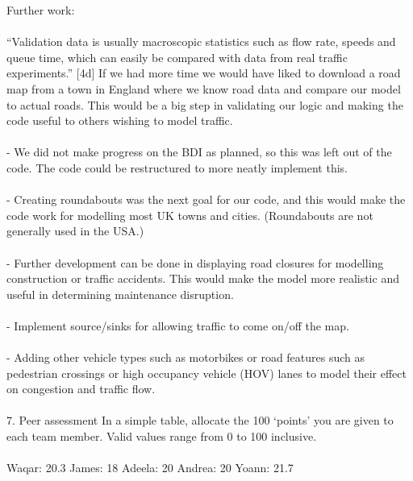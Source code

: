 \documentclass[11pt]{article}
\begin{document}
Further work:
\\ \\
“Validation data is usually macroscopic statistics such as flow rate, speeds and queue time, which can easily be compared with data from real traffic experiments.” [4d] If we had more time we would have liked to download a road map from a town in England where we know road data and compare our model to actual roads. This would be a big step in validating our logic and making the code useful to others wishing to model traffic.
\\ \\
- We did not make progress on the BDI as planned, so this was left out of the code. The code could be restructured to more neatly implement this.
\\ \\
- Creating roundabouts was the next goal for our code, and this would make the code work for modelling most UK towns and cities. (Roundabouts are not generally used in the USA.)
\\ \\
- Further development can be done in displaying road closures for modelling construction or traffic accidents. This would make the model more realistic and useful in determining maintenance disruption.
\\ \\
- Implement source/sinks for allowing traffic to come on/off the map.
\\ \\
- Adding other vehicle types such as motorbikes or road features such as pedestrian crossings or high occupancy vehicle (HOV) lanes to model their effect on congestion and traffic flow.
\\ \\

7. Peer assessment In a simple table, allocate the 100 ‘points’ you are given to each team member. Valid values range from 0 to 100 inclusive. 
\\ \\
Waqar:  20.3
James:  18
Adeela:  20
Andrea:  20
Yoann:  21.7
\end{document}
